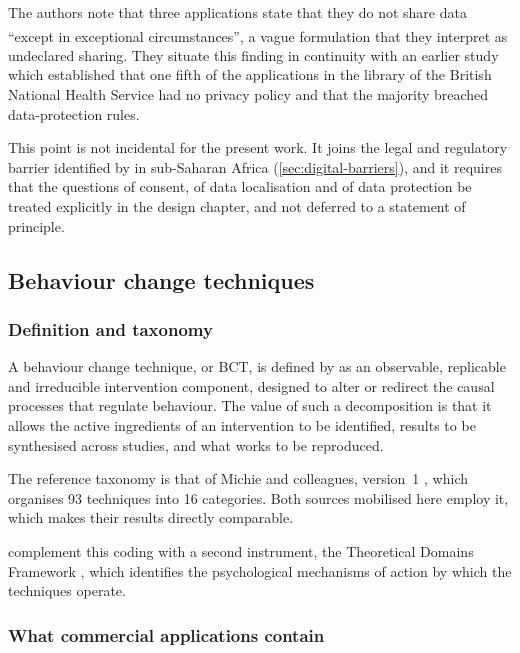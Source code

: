 \documentclass[12pt,a4paper,oneside]{report}
\newcommand{\bq}[1]{``#1''\textsuperscript{\dag}}
\begin{document}
The authors note that three applications state that they do not share data \bq{except in exceptional circumstances}, a vague formulation that they interpret as undeclared sharing. They situate this finding in continuity with an earlier study which established that one fifth of the applications in the library of the British National Health Service had no privacy policy and that the majority breached data-protection rules.

This point is not incidental for the present work. It joins the legal and regulatory barrier identified by \textcite{dodoo2022} in sub-Saharan Africa (\cref{sec:digital-barriers}), and it requires that the questions of consent, of data localisation and of data protection be treated explicitly in the design chapter, and not deferred to a statement of principle.

\subsection{Behaviour change techniques}\label{sec:bct}

\subsubsection{Definition and taxonomy}

A behaviour change technique, or BCT, is defined by \textcite{zhou2024} as an observable, replicable and irreducible intervention component, designed to alter or redirect the causal processes that regulate behaviour. The value of such a decomposition is that it allows the active ingredients of an intervention to be identified, results to be synthesised across studies, and what works to be reproduced.

The reference taxonomy is that of Michie and colleagues, version~1 \parencite{michie2013}, which organises 93 techniques into 16 categories. Both sources mobilised here employ it, which makes their results directly comparable.

\textcite{alessa2019} complement this coding with a second instrument, the Theoretical Domains Framework \parencite{cane2012}, which identifies the psychological mechanisms of action by which the techniques operate.

\subsubsection{What commercial applications contain}
\end{document}
